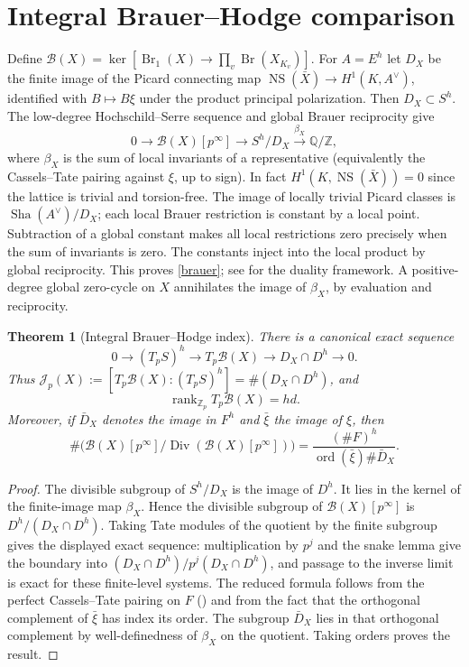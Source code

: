 \documentclass[11pt,a4paper]{article}
\newtheorem{theorem}{Theorem}[section]\newtheorem{lemma}[theorem]{Lemma}\newtheorem{corollary}[theorem]{Corollary}\newtheorem{proposition}[theorem]{Proposition}
\theoremstyle{remark}\newtheorem{remark}[theorem]{Remark}
\newcommand{\Sha}{\mathop{\mathrm{Sha}}}\newcommand{\Pic}{\operatorname{Pic}}\newcommand{\Br}{\operatorname{Br}}\newcommand{\NS}{\operatorname{NS}}\newcommand{\Gal}{\operatorname{Gal}}\newcommand{\Hom}{\operatorname{Hom}}\newcommand{\Z}{\mathbb Z}\newcommand{\Q}{\mathbb Q}\newcommand{\F}{\mathbb F}\newcommand{\G}{\mathbb G}\newcommand{\coker}{\operatorname{coker}}\newcommand{\loc}{\operatorname{loc}}\newcommand{\et}{\mathrm{\acute et}}\newcommand{\Div}{\operatorname{Div}}\newcommand{\ord}{\operatorname{ord}}\newcommand{\im}{\operatorname{im}}\newcommand{\diag}{\operatorname{diag}}\newcommand{\rank}{\operatorname{rank}}\newcommand{\Sel}{\operatorname{Sel}}
\begin{document}
\section{Integral Brauer--Hodge comparison}
Define $\mathcal B(X)=\ker[\Br_1(X)\to\prod_v\Br(X_{K_v})]$. For $A=E^h$ let $D_X$ be the finite image of the Picard connecting map $\NS(\bar X)\to H^1(K,A^\vee)$, identified with $B\mapsto B\xi$ under the product principal polarization. Then $D_X\subset S^h$. The low-degree Hochschild--Serre sequence and global Brauer reciprocity give
\begin{equation}\label{brauer}
 0\to\mathcal B(X)[p^\infty]\to S^h/D_X\xrightarrow{\beta_X}\Q/\Z,
\end{equation}
where $\beta_X$ is the sum of local invariants of a representative (equivalently the Cassels--Tate pairing against $\xi$, up to sign). In fact $H^1(K,\NS(\bar X))=0$ since the lattice is trivial and torsion-free. The image of locally trivial Picard classes is $\Sha(A^\vee)/D_X$; each local Brauer restriction is constant by a local point. Subtraction of a global constant makes all local restrictions zero precisely when the sum of invariants is zero. The constants inject into the local product by global reciprocity. This proves \eqref{brauer}; see \cite{hs2,ps} for the duality framework. A positive-degree global zero-cycle on $X$ annihilates the image of $\beta_X$, by evaluation and reciprocity.
\begin{theorem}[Integral Brauer--Hodge index]\label{brauerindex}
There is a canonical exact sequence
\[
 0\to (T_pS)^h\to T_p\mathcal B(X)\to D_X\cap D^h\to0.
\]
Thus $\mathcal J_p(X):=[T_p\mathcal B(X):(T_pS)^h]=\#(D_X\cap D^h)$, and
\[
 \rank_{\Z_p}T_p\mathcal B(X)=hd.
\]
Moreover, if $\bar D_X$ denotes the image in $F^h$ and $\bar\xi$ the image of $\xi$, then
\[
 \#\bigl(\mathcal B(X)[p^\infty]/\Div(\mathcal B(X)[p^\infty])\bigr)
 =\frac{(\#F)^h}{\ord(\bar\xi)\#\bar D_X}.
\]
\end{theorem}
\begin{proof}
The divisible subgroup of $S^h/D_X$ is the image of $D^h$. It lies in the kernel of the finite-image map $\beta_X$. Hence the divisible subgroup of $\mathcal B(X)[p^\infty]$ is $D^h/(D_X\cap D^h)$. Taking Tate modules of the quotient by the finite subgroup gives the displayed exact sequence: multiplication by $p^j$ and the snake lemma give the boundary into $(D_X\cap D^h)/p^j(D_X\cap D^h)$, and passage to the inverse limit is exact for these finite-level systems. The reduced formula follows from the perfect Cassels--Tate pairing on $F$ (\cite{ps}) and from the fact that the orthogonal complement of $\bar\xi$ has index its order. The subgroup $\bar D_X$ lies in that orthogonal complement by well-definedness of $\beta_X$ on the quotient. Taking orders proves the result.
\end{proof}
\end{document}
